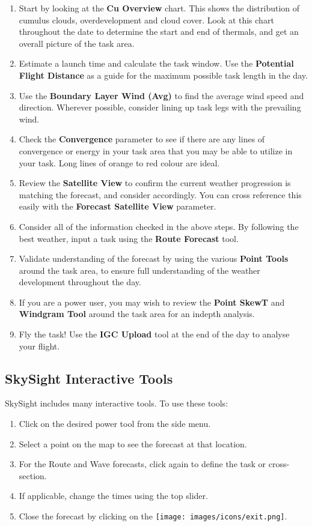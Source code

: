 \documentclass[9pt,a4paper,twocolumn]{article}
\begin{document}
\begin{enumerate}
\item Start by looking at the \textbf{Cu Overview} chart. This shows the distribution of cumulus clouds, overdevelopment and cloud cover. Look at this chart throughout the date to determine the start and end of thermals, and get an overall picture of the task area.
\item Estimate a launch time and calculate the task window. Use the \textbf{Potential Flight Distance} as a guide for the maximum possible task length in the day.
\item Use the \textbf{Boundary Layer Wind (Avg)} to find the average wind speed and direction. Wherever possible, consider lining up task legs with the prevailing wind.
\item Check the \textbf{Convergence} parameter to see if there are any lines of convergence or energy in your task area that you may be able to utilize in your task. Long lines of orange to red colour are ideal.
\item Review the \textbf{Satellite View} to confirm the current weather progression is matching the forecast, and consider accordingly. You can cross reference this easily with the \textbf{Forecast Satellite View} parameter.
\item Consider all of the information checked in the above steps. By following the best weather, input a task using the \textbf{Route Forecast} tool.
\item Validate understanding of the forecast by using the various \textbf{Point Tools} around the task area, to ensure full understanding of the weather development throughout the day.
\item If you are a power user, you may wish to review the \textbf{Point SkewT} and \textbf{Windgram Tool} around the task area for an indepth analysis.
\item Fly the task! Use the \textbf{IGC Upload} tool at the end of the day to analyse your flight.

\end{enumerate}
\subsection*{SkySight Interactive Tools}
SkySight includes many interactive tools. To use these tools:
\begin{enumerate}
\item Click on the desired power tool from the side menu.
\item Select a point on the map to see the forecast at that location.
\item For the Route and Wave forecasts, click again to define the task or cross-section.
\item If applicable, change the times using the top slider.
\item Close the forecast by clicking on the \texttt{[image: images/icons/exit.png]}.
\end{enumerate}
\end{document}
